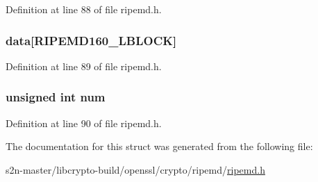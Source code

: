 Definition at line 88 of file ripemd.\+h.

\subsubsection[{\texorpdfstring{data}{data}}]{ data\mbox{[}{\bf R\+I\+P\+E\+M\+D160\+\_\+\+L\+B\+L\+O\+CK}\mbox{]}}\hypertarget{struct_r_i_p_e_m_d160state__st_a13e351c7c91f20f5a4126a1b85250776}{}\label{struct_r_i_p_e_m_d160state__st_a13e351c7c91f20f5a4126a1b85250776}


Definition at line 89 of file ripemd.\+h.

\subsubsection[{\texorpdfstring{num}{num}}]{\setlength{\rightskip}{0pt plus 5cm}unsigned int num}\hypertarget{struct_r_i_p_e_m_d160state__st_a41ddefd3473727cad32a9767c10faed8}{}\label{struct_r_i_p_e_m_d160state__st_a41ddefd3473727cad32a9767c10faed8}


Definition at line 90 of file ripemd.\+h.



The documentation for this struct was generated from the following file\+:\begin{DoxyCompactItemize}
\item 
s2n-\/master/libcrypto-\/build/openssl/crypto/ripemd/\hyperlink{ripemd_8h}{ripemd.\+h}\end{DoxyCompactItemize}

